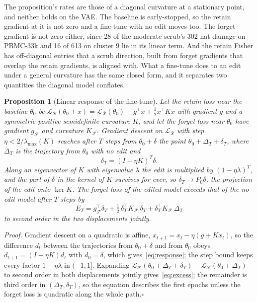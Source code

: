 \documentclass{article}
\newtheorem{proposition}{Proposition}
\begin{document}
The proposition's rates are those of a diagonal curvature at a stationary point, and neither holds on the VAE. The baseline is early-stopped, so the retain gradient at it is not zero and a fine-tune with no edit moves too. The forget gradient is not zero either, since 28 of the moderate scrub's 302-nat damage on PBMC-33k and 16 of 613 on cluster 9 lie in its linear term. And the retain Fisher has off-diagonal entries that a scrub direction, built from forget gradients that overlap the retain gradients, is aligned with. What a fine-tune does to an edit under a general curvature has the same closed form, and it separates two quantities the diagonal model conflates.
\begin{proposition}[Linear response of the fine-tune]
\label{prop:response}
Let the retain loss near the baseline $\theta_0$ be $\mathcal{L}_{\mathcal{R}}(\theta_0 + x) = \mathcal{L}_{\mathcal{R}}(\theta_0) + g^\top x + \tfrac12 x^\top K x$ with gradient $g$ and a symmetric positive semidefinite curvature $K$, and let the forget loss near $\theta_0$ have gradient $g_{\mathcal{F}}$ and curvature $K_{\mathcal{F}}$. Gradient descent on $\mathcal{L}_{\mathcal{R}}$ with step $\eta < 2/\lambda_{\max}(K)$ reaches after $T$ steps from $\theta_0 + \delta$ the point $\theta_0 + \Delta_T + \delta_T$, where $\Delta_T$ is the trajectory from $\theta_0$ with no edit and
\begin{equation}
\delta_T = (I - \eta K)^T \delta .
\label{eq:response}
\end{equation}
Along an eigenvector of $K$ with eigenvalue $\lambda$ the edit is multiplied by $(1 - \eta\lambda)^T$, and the part of $\delta$ in the kernel of $K$ survives for ever, so $\delta_T \to P_0 \delta$, the projection of the edit onto $\ker K$. The forget loss of the edited model exceeds that of the no-edit model after $T$ steps by
\begin{equation}
E_T = g_{\mathcal{F}}^\top \delta_T + \tfrac12\, \delta_T^\top K_{\mathcal{F}}\, \delta_T + \delta_T^\top K_{\mathcal{F}}\, \Delta_T
\label{eq:excess}
\end{equation}
to second order in the two displacements jointly.
\end{proposition}
\textit{Proof.} Gradient descent on a quadratic is affine, $x_{t+1} = x_t - \eta (g + K x_t)$, so the difference $d_t$ between the trajectories from $\theta_0 + \delta$ and from $\theta_0$ obeys $d_{t+1} = (I - \eta K) d_t$ with $d_0 = \delta$, which gives~\eqref{eq:response}; the step bound keeps every factor $1 - \eta\lambda$ in $(-1, 1]$. Expanding $\mathcal{L}_{\mathcal{F}}(\theta_0 + \Delta_T + \delta_T) - \mathcal{L}_{\mathcal{F}}(\theta_0 + \Delta_T)$ to second order in both displacements jointly gives~\eqref{eq:excess}; the remainder is third order in $(\Delta_T, \delta_T)$, so the equation describes the first epochs unless the forget loss is quadratic along the whole path.\hfill$\square$
\end{document}

